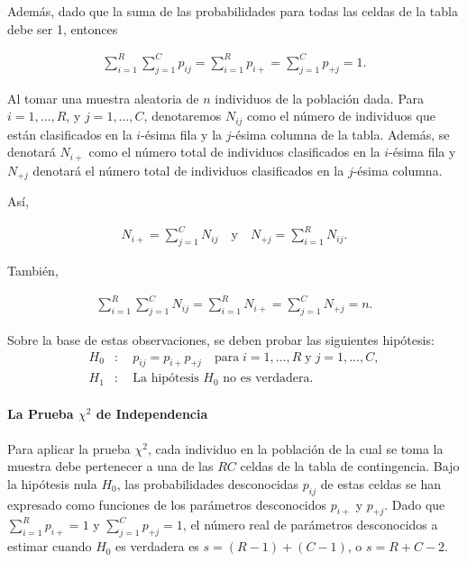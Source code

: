 \documentclass{book}
\begin{document}
Además, dado que la suma de las probabilidades para todas las celdas de la tabla debe ser 1, entonces

\begin{align}
\sum_{i=1}^{R} \sum_{j=1}^{C} p_{ij} = \sum_{i=1}^{R} p_{i+} = \sum_{j=1}^{C} p_{+j} = 1.
\end{align}

Al tomar una muestra aleatoria de $n$ individuos de la población dada. Para $i = 1, \ldots, R$, y $j = 1, \ldots, C$, denotaremos $N_{ij}$ como el número de individuos que están clasificados en la $i$-ésima fila y la $j$-ésima columna de la tabla. Además, se denotará $N_{i+}$ como el número total de individuos clasificados en la $i$-ésima fila y $N_{+j}$ denotará el número total de individuos clasificados en la $j$-ésima columna.

Así,

\begin{align}
N_{i+} = \sum_{j=1}^{C} N_{ij} \quad \text{y} \quad N_{+j} = \sum_{i=1}^{R} N_{ij}.
\end{align}

También,

\begin{align}
\sum_{i=1}^{R} \sum_{j=1}^{C} N_{ij} = \sum_{i=1}^{R} N_{i+} = \sum_{j=1}^{C} N_{+j} = n.
\end{align}

Sobre la base de estas observaciones, se deben probar las siguientes hipótesis:
\begin{align}
H_0&: \quad p_{ij} = p_{i+}p_{+j} \quad \text{para} \; i = 1, \ldots, R \; \text{y} \; j = 1, \ldots, C, \\
H_1&: \quad \text{La hipótesis } H_0 \text{ no es verdadera.}
\end{align}

\paragraph*{La Prueba $\chi^2$ de Independencia}
Para aplicar la prueba $\chi^2$, cada individuo en la población de la cual se toma la muestra debe pertenecer a una de las $RC$ celdas de la tabla de contingencia. Bajo la hipótesis nula $H_0$, las probabilidades desconocidas $p_{ij}$ de estas celdas se han expresado como funciones de los parámetros desconocidos $p_{i+}$ y $p_{+j}$. Dado que $\sum_{i=1}^{R} p_{i+} = 1$ y $\sum_{j=1}^{C} p_{+j} = 1$, el número real de parámetros desconocidos a estimar cuando $H_0$ es verdadera es $s = (R - 1) + (C - 1)$, o $s = R + C - 2$.
\end{document}
